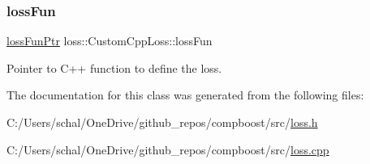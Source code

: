 \subsubsection{\texorpdfstring{loss\+Fun}{lossFun}}
{\footnotesize\ttfamily \mbox{\hyperlink{namespaceloss_a6658cb84c8687d6dd0904c00801542f3}{loss\+Fun\+Ptr}} loss\+::\+Custom\+Cpp\+Loss\+::loss\+Fun\hspace{0.3cm}{\ttfamily [private]}}



Pointer to {\ttfamily C++} function to define the loss. 



The documentation for this class was generated from the following files\+:\begin{DoxyCompactItemize}
\item 
C\+:/\+Users/schal/\+One\+Drive/github\+\_\+repos/compboost/src/\mbox{\hyperlink{loss_8h}{loss.\+h}}\item 
C\+:/\+Users/schal/\+One\+Drive/github\+\_\+repos/compboost/src/\mbox{\hyperlink{loss_8cpp}{loss.\+cpp}}\end{DoxyCompactItemize}
